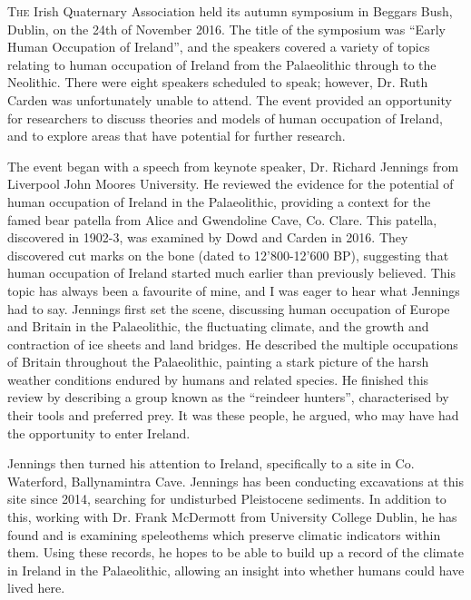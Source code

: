 \documentclass[%
	]{ijsra}
\begin{document}
\IJSRAopening%
\lettrine{T}{he} 
Irish Quaternary Association held its autumn symposium in Beggars Bush, Dublin, on the 24th of November 2016. The title of the symposium was “Early Human Occupation of Ireland”, and the speakers covered a variety of topics relating to human occupation of Ireland from the Palaeolithic through to the Neolithic. There were eight speakers scheduled to speak; however, Dr. Ruth Carden was unfortunately unable to attend. The event provided an opportunity for researchers to discuss theories and models of human occupation of Ireland, and to explore areas that have potential for further research.

The event began with a speech from keynote speaker, Dr. Richard Jennings from Liverpool John Moores University. He reviewed the evidence for the potential of human occupation of Ireland in the Palaeolithic, providing a context for the famed bear patella from Alice and Gwendoline Cave, Co. Clare. This patella, discovered in 1902-3, was examined by Dowd and Carden in 2016. They discovered cut marks on the bone (dated to 12’800-12’600 BP), suggesting that human occupation of Ireland started much earlier than previously believed. This topic has always been a favourite of mine, and I was eager to hear what Jennings had to say.
Jennings first set the scene, discussing human occupation of Europe and Britain in the Palaeolithic, the fluctuating climate, and the growth and contraction of ice sheets and land bridges. He described the multiple occupations of Britain throughout the Palaeolithic, painting a stark picture of the harsh weather conditions endured by humans and related species. He finished this review by describing a group known as the “reindeer hunters”, characterised by their tools and preferred prey. It was these people, he argued, who may have had the opportunity to enter Ireland. 

Jennings then turned his attention to Ireland, specifically to a site in Co. Waterford, Ballynamintra Cave. Jennings has been conducting excavations at this site since 2014, searching for undisturbed Pleistocene sediments. In addition to this, working with Dr. Frank McDermott from University College Dublin, he has found and is examining speleothems which preserve climatic indicators within them. Using these records, he hopes to be able to build up a record of the climate in Ireland in the Palaeolithic, allowing an insight into whether humans could have lived here. 
\end{document}

